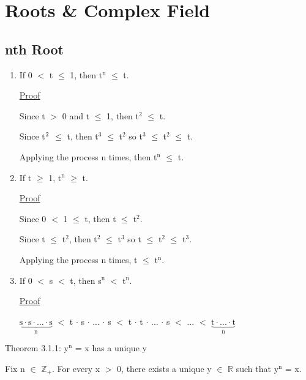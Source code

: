 \newpage
\section[Day 3: Roots and the Complex Field]{Roots \& Complex Field}

\subsection{nth Root}

	\begin{enumerate}[label=(\alph*), leftmargin=1cm, itemsep=0.4em]
		\item If 0 $<$ t $\leq$ 1, then t$^\text{n}$ $ \leq $ t.

			{ \color{magenta} \underline{Proof} } 
		
				Since t $>$ 0 and t $\leq$ 1, then t$^\text{2}$ $\leq$ t.

				Since t$^\text2{}$ $\leq$ t, then t$^\text{3}$ $\leq$ t$^\text{2}$
				so t$^\text{3}$ $\leq$ t$^\text{2}$ $\leq$ t.

				Applying the process n times, then t$^\text{n}$ $\leq$ t.

		\item If t $\geq$ 1, t$^\text{n}$ $ \geq $ t.

			{ \color{magenta} \underline{Proof} } 
		
				Since 0 $<$ 1 $\leq$ t, then t $\leq$ t$^\text{2}$.

				Since t $\leq$ t$^\text{2}$, then t$^\text{2}$ $\leq$ t$^\text{3}$
				so t $\leq$ t$^\text{2}$ $\leq$ t$^\text{3}$.

				Applying the process n times, t $\leq$ t$^\text{n}$.

		\item If 0 $<$ s $<$ t, then s$^\text{n}$ $<$ t$^\text{n}$.

			{ \color{magenta} \underline{Proof} } 
		
				$\underbrace{\text{s} \cdot \text{s} \cdot ... \cdot \text{s}}_\text{n}$
				$<$ t $\cdot$ s $\cdot$ ... $\cdot$ s
				$<$ t $\cdot$ t $\cdot$ ... $\cdot$ s $<$ ... $<$
				$\underbrace{\text{t} \cdot ... \cdot \text{t}}_\text{n}$
	\end{enumerate}


{ \color{red} Theorem 3.1.1: y$^\text{n}$ = x has a unique y }

	\qquad Fix n $\in$ $\mathbb{Z}_+$. For every x $>$ 0, there exists a unique y
	$\in$ $ \mathbb{R} $ such that y$^\text{n}$ = x.

